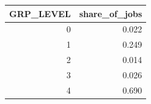 \begin{tabular}{rr}
\toprule
GRP_LEVEL & share_of_jobs \\
\midrule
0 & 0.022 \\
1 & 0.249 \\
2 & 0.014 \\
3 & 0.026 \\
4 & 0.690 \\
\bottomrule
\end{tabular}

